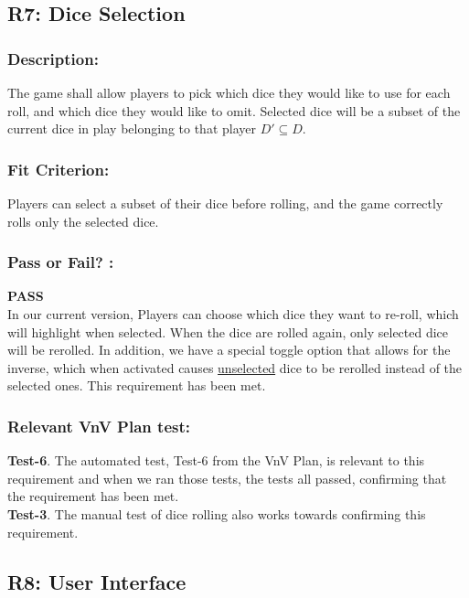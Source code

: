 \documentclass[12pt, titlepage]{article}
\begin{document}
\subsection{R7: Dice Selection} 
\label{R7} 

\subsubsection*{Description:} The game shall allow players to pick which dice they would like to use for each roll, and which dice they would like to omit. Selected dice will be a subset of the current dice in play belonging to that player $D' \subseteq D$.

\subsubsection*{Fit Criterion:} Players can select a subset of their dice before rolling, and the game correctly rolls only the selected dice.


\subsubsection*{Pass or Fail? :} 

 \noindent \textbf{PASS}\\
 
 In our current version, Players can choose which dice they want to re-roll, which will highlight when selected. When the dice are rolled again, only selected dice will be rerolled. In addition, we have a special toggle option that allows for the inverse, which when activated causes \underline{unselected} dice to be rerolled instead of the selected ones. This requirement has been met.

\subsubsection*{Relevant VnV Plan test: } \textbf{Test-6}.  The automated test, Test-6 from the VnV Plan, is relevant to this requirement and when we ran those tests, the tests all passed, confirming that the requirement has been met.\\
\textbf{Test-3}. The manual test of dice rolling also works towards confirming this requirement.


\subsection{R8: User Interface} 
\label{R8} 
\end{document}

